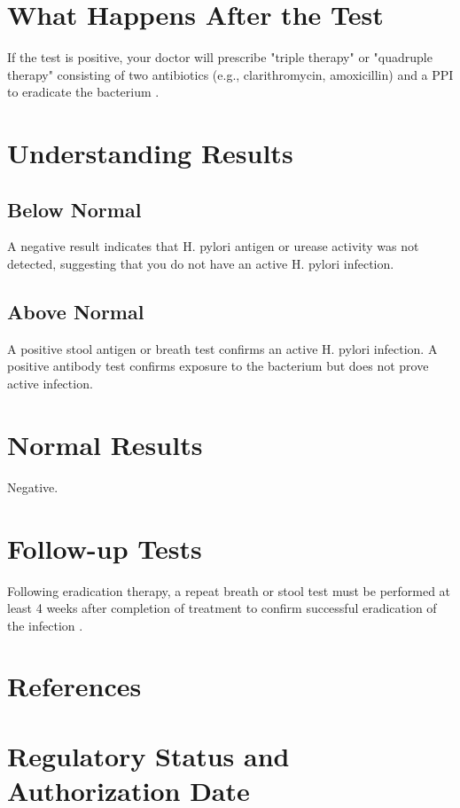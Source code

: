 \section*{What Happens After the Test}
If the test is positive, your doctor will prescribe "triple therapy" or "quadruple therapy" consisting of two antibiotics (e.g., clarithromycin, amoxicillin) and a PPI to eradicate the bacterium \cite{chey2017treatment}.

\section*{Understanding Results}

\subsection*{Below Normal}
A negative result indicates that H. pylori antigen or urease activity was not detected, suggesting that you do not have an active H. pylori infection.

\subsection*{Above Normal}
A positive stool antigen or breath test confirms an active H. pylori infection. A positive antibody test confirms exposure to the bacterium but does not prove active infection.

\section*{Normal Results}
Negative.

\section*{Follow-up Tests}
Following eradication therapy, a repeat breath or stool test must be performed at least 4 weeks after completion of treatment to confirm successful eradication of the infection \cite{malfertheiner2017management}.

\section*{References}



\clearpage
\section*{Regulatory Status and Authorization Date}

\clearpage
